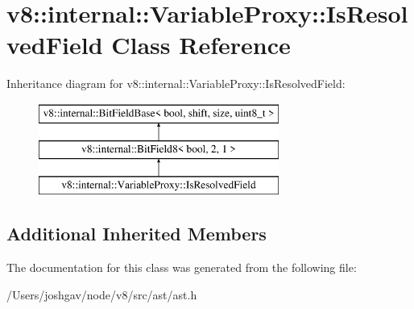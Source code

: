 \hypertarget{classv8_1_1internal_1_1_variable_proxy_1_1_is_resolved_field}{}\section{v8\+:\+:internal\+:\+:Variable\+Proxy\+:\+:Is\+Resolved\+Field Class Reference}
\label{classv8_1_1internal_1_1_variable_proxy_1_1_is_resolved_field}
Inheritance diagram for v8\+:\+:internal\+:\+:Variable\+Proxy\+:\+:Is\+Resolved\+Field\+:\begin{figure}[H]
\begin{center}
\leavevmode
\includegraphics[height=3.000000cm]{classv8_1_1internal_1_1_variable_proxy_1_1_is_resolved_field}
\end{center}
\end{figure}
\subsection*{Additional Inherited Members}


The documentation for this class was generated from the following file\+:\begin{DoxyCompactItemize}
\item 
/\+Users/joshgav/node/v8/src/ast/ast.\+h\end{DoxyCompactItemize}
